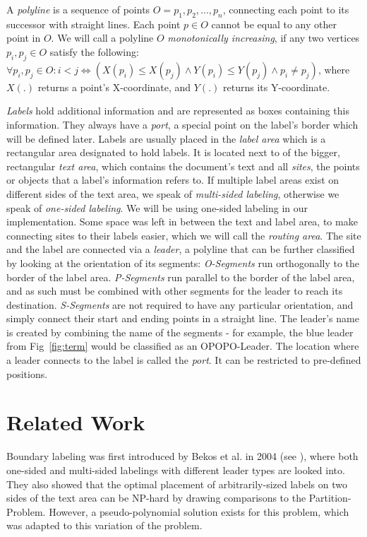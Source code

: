 \documentclass[11pt,a4paper]{vutinfth}
\begin{document}
A \emph{polyline} is a sequence of points $O=p_1, p_2, ...,p_n$, connecting each point to its successor with straight lines. Each point $p \in O$ cannot be equal to any other point in $O$.
We will call a polyline $O$ \emph{monotonically increasing}, if any two vertices $p_i, p_j \in O$ satisfy the following: $\forall p_i, p_j \in O: i<j \iff (X(p_i)\leq X(p_j) \land Y(p_i)\leq Y(p_j)\land p_i \neq p_j)$, where $X(.)$ returns a point's X-coordinate, and $Y(.)$ returns its Y-coordinate.

\emph{Labels} hold additional information and are represented as boxes containing this information. They always have a \emph{port}, a special point on the label's border which will be defined later. Labels are usually placed in the \emph{label area} which is a rectangular area designated to hold labels. It is located next to of the bigger, rectangular \emph{text area}, which contains the document's text and all \emph{sites}, the points or objects that a label's information refers to. If multiple label areas exist on different sides of the text area, we speak of \emph{multi-sided labeling}, otherwise we speak of \emph{one-sided labeling}. We will be using one-sided labeling in our implementation. Some space was left in between the text and label area, to make connecting sites to their labels easier, which we will call the \emph{routing area}. The site and the label are connected via a \emph{leader}, a polyline that can be further classified by looking at the orientation of its segments: \emph{O-Segments} run orthogonally to the border of the label area. \emph{P-Segments} run parallel to the border of the label area, and as such must be combined with other segments for the leader to reach its destination. \emph{S-Segments} are not required to have any particular orientation, and simply connect their start and ending points in a straight line.
The leader's name is created by combining the name of the segments - for example, the blue leader from Fig~\ref*{fig:term} would be classified as an OPOPO-Leader.
The location where a leader connects to the label is called the \emph{port}. It can be restricted to pre-defined positions. 


\section{Related Work}

Boundary labeling was first introduced by Bekos et al. in 2004 (see \cite{Bekos2005}), where both one-sided and multi-sided labelings with different leader types are looked into. They also showed that the optimal placement of arbitrarily-sized labels on two sides of the text area can be NP-hard by drawing comparisons to the Partition-Problem. However, a pseudo-polynomial solution exists for this problem, which was adapted to this variation of the problem.
\end{document}
